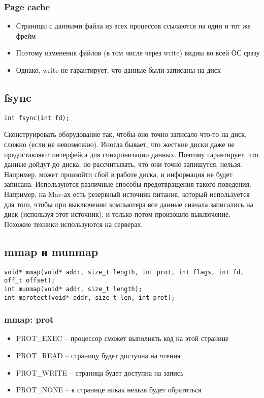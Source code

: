     \subsubsection{Page cache}
      \begin{itemize}
        \item Страницы с данными файла из всех процессов ссылаются на один и тот же фрейм
        \item Поэтому изменения файлов (в том числе через write) видны во всей ОС сразу
        \item Однако, write не гарантирует, что данные были записаны на диск
      \end{itemize}
    
    \subsection{fsync}
\begin{lstlisting}[style=cpp]
int fsync(int fd);
\end{lstlisting}
Сконструировать оборудование так, чтобы оно точно записало что-то на диск, сложно (если не невозможно). Иногда бывает, что жесткие диски даже не предоставляют интерфейса для синхронизации данных. Поэтому  гарантирует, что данные дойдут до диска, но рассчитывать, что они точно запишутся, нельзя. Например, может произойти сбой в работе диска, и информация не будет записана. Используются различные способы предотвращения такого поведения. Например, на Mac-ах есть резервный источник питания, который используется для того, чтобы при выключении компьютера все данные сначала записались на диск (используя этот источник), и только потом произошло выключение. Похожие техники используются на серверах.

    \subsection{mmap и munmap}
\begin{lstlisting}[style=cpp]
void* mmap(void* addr, size_t length, int prot, int flags, int fd, off_t offset);
int munmap(void* addr, size_t length);
int mprotect(void* addr, size_t len, int prot);
\end{lstlisting}
    
    \subsubsection{mmap: prot}
      \begin{itemize}
        \item PROT\_EXEC -- процессор сможет выполнять код на этой странице
        \item PROT\_READ -- страницу будет доступна на чтения
        \item PROT\_WRITE -- страница будет доступна на запись
        \item PROT\_NONE -- к странице никак нельзя будет обратиться
      \end{itemize}
    
